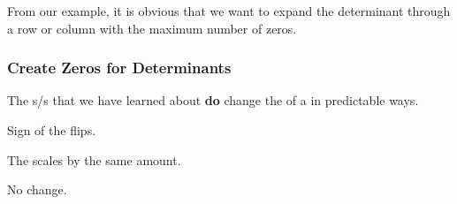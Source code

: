 From our example, it is obvious that we want to expand the determinant through a row or column with the maximum number of zeros.

\subsubsection{Create Zeros for Determinants}\label{subsubsec:Create_0s_Determinants}
The s/s that we have learned about \textbf{do} change the  of a  in predictable ways.

\begin{description}[noitemsep]
\item[Interchange Rows:] Sign of the  flips.
\item[Scalar Multiply:] The  scales by the same amount.
\item[Multiply Row and Add:] No change.
\end{description}

